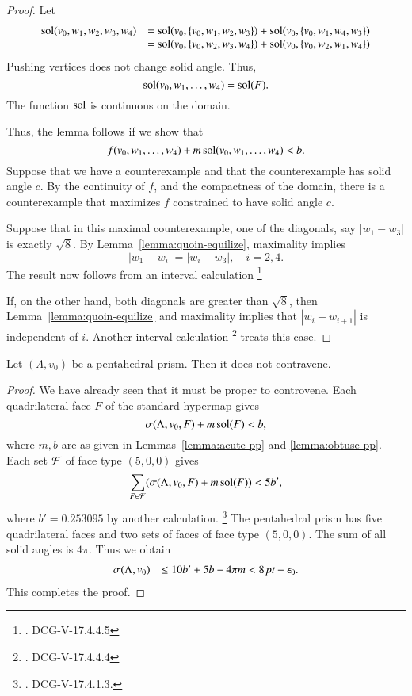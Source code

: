 \begin{proof}
Let
$$
  \begin{array}{lll}
  \operatorname{sol}(v_0,w_1,w_2,w_3,w_4) &= \operatorname{sol}(v_0,\{v_0,w_1,w_2,w_3\}) +
    \operatorname{sol}(v_0,\{v_0,w_1,w_4,w_3\}) \\
  &= \operatorname{sol}(v_0,\{v_0,w_2,w_3,w_4\}) +
    \operatorname{sol}(v_0,\{v_0,w_2,w_1,w_4\}) \\
  \end{array}
$$
Pushing vertices does not change solid angle.  Thus,
$$
\operatorname{sol}(v_0,w_1,\ldots,w_4) = \operatorname{sol}(F).
$$
The function $\operatorname{sol}$ is continuous on the domain.

Thus, the lemma follows if we show that
$$f(v_0,w_1,\ldots,w_4) + m \operatorname{sol}(v_0,w_1,\ldots,w_4) < b.$$
Suppose that we have a counterexample and that the counterexample
has solid angle $c$.  By the continuity of $f$, and the compactness
of the domain, there is a counterexample that maximizes $f$ constrained
to have solid angle $c$.  

Suppose that in this maximal counterexample, one of the diagonals, say 
$|w_1-w_3|$ is exactly $\sqrt8$.  
By Lemma~\ref{lemma:quoin-equilize}, maximality implies
$$
|w_1-w_i|=|w_i-w_3|,\quad i=2,4.
$$
The result now follows from an interval calculation%
\footnote{. DCG-V-17.4.4.5}

If, on the other hand, both diagonals are greater than $\sqrt8$, then
Lemma~\ref{lemma:quoin-equilize} and maximality implies that
$|w_i-w_{i+1}|$ is independent of $i$.  Another interval
calculation%
\footnote{. DCG-V-17.4.4.4}
treats this case.
\end{proof}

\begin{lemma}
Let $(\Lambda,v_0)$ be a pentahedral prism.  Then it does not
contravene.
\end{lemma}

\begin{proof} We have already seen that it must be proper to
controvene.  Each quadrilateral face $F$ of the standard hypermap
gives
   $$\sigma(\Lambda,v_0,F) + m\operatorname{sol}(F) < b,$$
where $m,b$ are as given in Lemmas~\ref{lemma:acute-pp} and 
\ref{lemma:obtuse-pp}.  Each set ${\mathcal F}$ of face type $(5,0,0)$ gives
   $$
   \sum_{F\in{\mathcal F}}(\sigma(\Lambda,v_0,F) + m\operatorname{sol}(F)) < 5 b',
   $$
where $b'= 0.253095$ by another calculation.%
\footnote{.  DCG-V-17.4.1.3.}
The pentahedral prism has five quadrilateral faces and two sets
of faces of face type $(5,0,0)$.  The sum of all solid angles is $4\pi$.
Thus we obtain
   $$
   \begin{array}{lll}
   \sigma(\Lambda,v_0) &\le 10 b' + 5 b - 4\pi m < 8\,\hbox{\it pt} -\epsilon_0.
   \end{array}
   $$
This completes the proof.
\end{proof}

